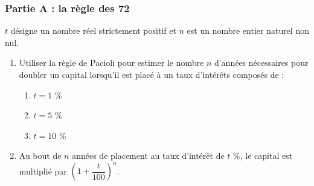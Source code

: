 \documentclass[a4paper,11pt,exos]{nsi} %
\begin{document}
\subsubsection*{Partie A : la règle des 72}
$t$ désigne un nombre réel strictement positif et $n$ est un nombre entier naturel non nul.
\begin{enumerate}
    \item Utiliser la règle de Pacioli pour estimer le nombre $n$ d'années nécessaires pour doubler un capital lorsqu'il est placé à un taux d'intérêts composés de :
    \begin{multicols}{3}
        \begin{enumerate}[label=\textbullet]
            \item $t=1$ \%
            \item $t=5$ \%
            \item $t=10$ \%
        \end{enumerate}
    \end{multicols}
    \item Au bout de $n$ années de placement au taux d'intérêt de $t$ \%, le capital est multiplié par $\left(1+\dfrac{t}{100}\right)^n$.
\end{enumerate}
\end{document}
